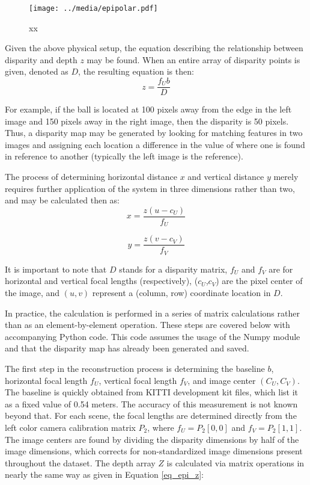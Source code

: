 \begin{figure}[ht]
    \centering
	\texttt{[image: ../media/epipolar.pdf]}
	\caption{xx}
	\label{epipolar}
\end{figure}

Given the above physical setup, the equation describing the relationship between disparity and depth $z$ may be found. When an entire array of disparity points is given, denoted as $D$, the resulting equation is then: 
\begin{equation}
z = \frac{f_U b}{D}
\label{eq_epi_z}
\end{equation}

For example, if the ball is located at 100 pixels away from the edge in the left image and 150 pixels away in the right image, then the disparity is 50 pixels. Thus, a disparity map may be generated by looking for matching features in two images and assigning each location a difference in the value of where one is found in reference to another (typically the left image is the reference).

The process of determining horizontal distance $x$ and vertical distance $y$ merely requires further application of the system in three dimensions rather than two, and may be calculated then as: 
\begin{equation}
x = \frac{z (u - c_U)}{f_U}
\end{equation}

\begin{equation}
y = \frac{z(v - c_V)}{f_V}
\end{equation}

It is important to note that $D$ stands for a disparity matrix, $f_U$ and $f_V$ are for horizontal and vertical focal lengths (respectively), ($c_U$,$c_V$) are the pixel center of the image, and $(u,v)$ represent a (column, row) coordinate location in $D$. 

In practice, the calculation is performed in a series of matrix calculations rather than as an element-by-element operation. These steps are covered below with accompanying Python code. This code assumes the usage of the Numpy module and that the disparity map has already been generated and saved.

The first step in the reconstruction process is determining the baseline $b$, horizontal focal length $f_U$, vertical focal length $f_V$, and image center $(C_U,C_V)$. The baseline is quickly obtained from KITTI development kit files, which list it as a fixed value of 0.54 meters. The accuracy of this measurement is not known beyond that. For each scene, the focal lengths are determined directly from the left color camera calibration matrix $P_2$, where $f_U=P_2[0,0]$ and $f_V=P_2[1,1]$. The image centers are found by dividing the disparity dimensions by half of the image dimensions, which corrects for non-standardized image dimensions present throughout the dataset. The depth array $Z$ is calculated via matrix operations in nearly the same way as given in Equation \ref{eq_epi_z}: 

